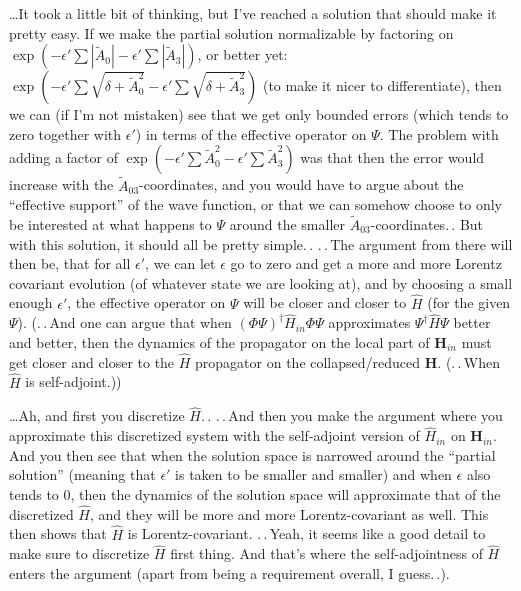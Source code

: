 \documentclass{report}
\begin{document}
\ldots It took a little bit of thinking, but I've reached a solution that should make it pretty easy. If we make the partial solution normalizable by factoring on 
$\exp(-\epsilon' \sum | \tilde A_0 | - \epsilon' \sum | \tilde A_3 |)$, or better yet:\\ $\exp(-\epsilon' \sum \sqrt{\delta + \tilde A_0^2 } - \epsilon' \sum \sqrt{\delta + \tilde A_3^2 })$ (to make it nicer to differentiate), then we can (if I'm not mistaken) see that we get only bounded errors (which tends to zero together with $\epsilon'$) in terms of the effective operator on $\Psi$. The problem with adding a factor of $\exp(-\epsilon' \sum \tilde A_0^2 - \epsilon' \sum \tilde A_3^2)$ was that then the error would increase with the $\tilde A_{03}$-coordinates, and you would have to argue about the ``effective support'' of the wave function, or that we can somehow choose to only be interested at what happens to $\Psi$ around the smaller $\tilde A_{03}$-coordinates.\,. But with this solution, it should all be pretty simple.\,. %
.\,.\,The argument from there will then be, that for all $\epsilon'$, we can let $\epsilon$ go to zero and get a more and more Lorentz covariant evolution (of whatever state we are looking at), and by choosing a small enough $\epsilon'$, the effective operator on $\Psi$ will be closer and closer to $\hat H$ (for the given $\Psi$). (.\,.\,And one can %
argue that when $(\Phi\Psi)^\dagger \hat H_{in} \Phi\Psi$ approximates $\Psi^\dagger \hat H \Psi$ better and better, then the dynamics of the propagator on the local part of $\mathbf{H}_{in}$ must get closer and closer to the $\hat H$ propagator on the collapsed/reduced $\mathbf{H}$. (.\,.\,When $\hat H$ is self-adjoint.))

\ldots Ah, and first you discretize $\hat H$.\,. .\,.\,And then you make the argument where you approximate this discretized system with the self-adjoint version of $\hat H_{in}$ on $\mathbf{H}_{in}$. And you then see that when the solution space is narrowed around the ``partial solution'' (meaning that $\epsilon'$ is taken to be smaller and smaller) and when $\epsilon$ also tends to 0, then the dynamics of the solution space will approximate that of the discretized $\hat H$, and they will be more and more Lorentz-covariant as well. This then shows that $\hat H$ is Lorentz-covariant. .\,.\,Yeah, it seems like a good detail to make sure to discretize $\hat H$ first thing. And that's where the self-adjointness of $\hat H$ enters the argument (apart from being a requirement overall, I guess.\,.). 
\end{document}
